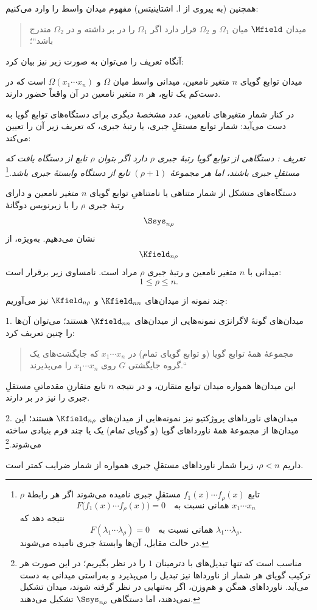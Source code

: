\documentclass[11pt]{article}
\providecommand{\glqq}{\textquotedblbase}
\providecommand{\grqq}{\textquotedblleft}
\newcommand{\srcLTR}[1]{\relax\ifmmode\text{\mbox{\babelsublr{\foreignlanguage{english}{#1}}}}\else\babelsublr{\foreignlanguage{english}{#1}}\fi}
\newcommand{\srcfn}[2]{\begingroup\renewcommand{\thefootnote}{\srcLTR{#1}}\footnote{#2}\addtocounter{footnote}{-1}\endgroup}
\begin{document}
همچنین (به پیروی از ا. اشتاینیتس) مفهوم میدان واسط را وارد می‌کنیم:
\begin{quote}
\glqq{}میدان $\Mfield$ میان $\Omega_1$ و $\Omega_2$ قرار دارد اگر $\Omega_1$ را در بر داشته و در $\Omega_2$ مندرج باشد\grqq{}؛
\end{quote}
آنگاه تعریف \srcLTR{I} را می‌توان به صورت زیر نیز بیان کرد:

میدان توابع گویای $n$ متغیر نامعین، میدانی واسط میان $\Omega$ و $\Omega(x_1\cdots x_n)$ است که در دست‌کم یک تابع، هر $n$ متغیر نامعین در آن واقعاً حضور دارند.

در کنار شمار متغیرهای نامعین، عدد مشخصهٔ دیگری برای دستگاه‌های توابع گویا به دست می‌آید: شمار توابع مستقلِ جبری، یا رتبهٔ جبری، که تعریف زیر آن را تعیین می‌کند:

\emph{تعریف \srcLTR{II}: دستگاهی از توابع گویا رتبهٔ جبری $\rho$ دارد اگر بتوان $\rho$ تابع از دستگاه یافت که مستقلِ جبری باشند، اما هر مجموعهٔ $(\rho+1)$ تابع از دستگاه وابستهٔ جبری باشد.}\srcfn{***)}{$\rho$ تابع $f_1(x)\cdots f_\rho(x)$ مستقلِ جبری نامیده می‌شوند اگر هر رابطهٔ
\[
F\bigl(f_1(x)\cdots f_\rho(x)\bigr)=0\quad\text{همانی نسبت به }x_1\cdots x_n
\]
نتیجه دهد که
\[
F(\lambda_1\cdots \lambda_\rho)=0\quad\text{همانی نسبت به }\lambda_1\cdots \lambda_\rho.
\]
در حالت مقابل، آن‌ها وابستهٔ جبری نامیده می‌شوند.}

دستگاه‌های متشکل از شمار متناهی یا نامتناهیِ توابع گویای $n$ متغیر نامعین و دارای رتبهٔ جبری $\rho$ را با زیرنویس دوگانهٔ
\[
  \Ssys_{n\rho}
\]
نشان می‌دهیم. به‌ویژه، از
\[
  \Kfield_{n\rho}
\]
میدانی با $n$ متغیر نامعین و رتبهٔ جبری $\rho$ مراد است. نامساوی زیر برقرار است:
\[
  1\leq \rho\leq n.
\]

چند نمونه از میدان‌های $\Kfield_{nn}$ و $\Kfield_{n\rho}$ نیز می‌آوریم:

1. میدان‌های گونهٔ لاگرانژی نمونه‌هایی از میدان‌های $\Kfield_{nn}$ هستند؛ می‌توان آن‌ها را چنین تعریف کرد:
\begin{quote}
\glqq{}مجموعهٔ همهٔ توابع گویا (و توابع گویای تمام) در $x_1\cdots x_n$ که جایگشت‌های یک گروه جایگشتی $G$ روی $x_1\cdots x_n$ را می‌پذیرند.\grqq{}
\end{quote}
این میدان‌ها همواره میدان توابع متقارن، و در نتیجه $n$ تابع متقارنِ مقدماتیِ مستقلِ جبری را نیز در بر دارند.

2. میدان‌های ناورداهای پروژکتیو نیز نمونه‌هایی از میدان‌های $\Kfield_{n\rho}$ هستند؛ این میدان‌ها از مجموعهٔ همهٔ ناورداهای گویا (و گویای تمام) یک یا چند فرم بنیادی ساخته می‌شوند.\srcfn{*)}{مناسب است که تنها تبدیل‌های با دترمینان $1$ را در نظر بگیریم؛ در این صورت هر ترکیب گویای هر شمار از ناورداها نیز تبدیل را می‌پذیرد و به‌راستی میدانی به دست می‌آید. ناورداهای همگن و هم‌وزن، اگر به‌تنهایی در نظر گرفته شوند، میدان تشکیل نمی‌دهند، اما دستگاهی $\Ssys_{n\rho}$ تشکیل می‌دهند.} داریم $\rho<n$، زیرا شمار ناورداهای مستقلِ جبری همواره از شمار ضرایب کمتر است.
\end{document}
